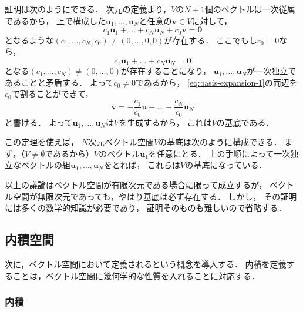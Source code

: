 \documentclass[
]{sotsu}
\begin{document}
証明は次のようにできる．
次元の定義より，$V$の$N + 1$個のベクトルは一次従属であるから，
上で構成した$\symbf{u}_1, \dots, \symbf{u}_N$と任意の$\symbf{v} \in V$に対して，
\begin{equation}
    \label{eq:basis-expansion-1}
    c_1 \symbf{u}_1 + \dots + c_N \symbf{u}_N + c_0 \symbf{v} = \symbf{0}
\end{equation}
となるような$(c_1, \dots, c_N, c_0) \neq (0, \dots, 0, 0)$が存在する．
ここでもし$c_0 = 0$なら，
\begin{equation*}
    c_1 \symbf{u}_1 + \dots + c_N \symbf{u}_N = \symbf{0}
\end{equation*}
となる$(c_1, \dots, c_N) \neq (0, \dots, 0)$が存在することになり，
$\symbf{u}_1, \dots, \symbf{u}_N$が一次独立であることと矛盾する．
よって$c_0 \neq 0$であるから，
\cref{eq:basis-expansion-1}の両辺を$c_0$で割ることができて，
\begin{equation*}
    \symbf{v} = -\frac{c_1}{c_0} \symbf{u} - \dots - \frac{c_N}{c_0} \symbf{u}_N
\end{equation*}
と書ける．
よって$\symbf{u}_1, \dots, \symbf{u}_N$は$V$を生成するから，
これは$V$の基底である．\qedsymbol

この定理を使えば，
$N$次元ベクトル空間$V$の基底は次のように構成できる．
まず，（$V \neq \emptyset$であるから）$V$のベクトル$\symbf{u}_1$を任意にとる．
上の手順によって一次独立なベクトルの組$\symbf{u}_1, \dots, \symbf{u}_N$をとれば，
これらは$V$の基底になっている．

以上の議論はベクトル空間が有限次元である場合に限って成立するが，
ベクトル空間が無限次元であっても，やはり基底は必ず存在する．
しかし，
その証明には多くの数学的知識が必要であり，
証明そのものも難しいので省略する．




\subsection{内積空間}

次に，ベクトル空間において定義されるという概念を導入する．
内積を定義することは，ベクトル空間に幾何学的な性質を入れることに対応する．


\subsubsection{内積}
\label{sec:inner-product}
\end{document}
